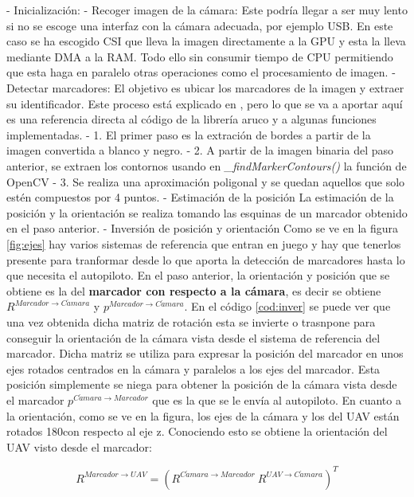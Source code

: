 - Inicialización: 
- Recoger imagen de la cámara: Este podría llegar a ser muy lento si no se escoge una interfaz con la cámara adecuada, por ejemplo USB. En este caso se ha escogido CSI que lleva la imagen directamente a la GPU y esta la lleva mediante DMA a la RAM. Todo ello sin consumir tiempo de CPU permitiendo que esta haga en paralelo otras operaciones como el procesamiento de imagen.
- Detectar marcadores: El objetivo es ubicar los marcadores de la imagen y extraer su identificador. Este proceso está explicado en \cite{aruco2014}, pero lo que se va a aportar aquí es una referencia directa al código de la librería aruco y a algunas funciones implementadas. 
	- 1. El primer paso es la extración de bordes a partir de la imagen convertida a blanco y negro. 
	- 2. A partir de la imagen binaria del paso anterior, se extraen los contornos usando en \textit{\_findMarkerContours()} la función de OpenCV  \textit{}
	- 3. Se realiza una aproximación poligonal y se quedan aquellos que solo estén compuestos por 4 puntos. 
- Estimación de la posición
	La estimación de la posición y la orientación se realiza tomando las esquinas de un marcador obtenido en el paso anterior.  
- Inversión de posición y orientación 
	Como se ve en la figura \ref{fig:ejes} hay varios sistemas de referencia que entran en juego y hay que tenerlos presente para tranformar desde lo que aporta la detección de marcadores hasta lo que necesita el autopiloto. En el paso anterior, la orientación y posición que se obtiene es la del \textbf{marcador con respecto a la cámara}, es decir se obtiene $R^{Marcador\rightarrow C\acute{a}mara}$ y $p^{Marcador\rightarrow C\acute{a}mara}$. En el código \ref{cod:inver} se puede ver que una vez obtenida dicha matriz de rotación esta se invierte o trasnpone para conseguir la orientación de la cámara vista desde el sistema de referencia del marcador. Dicha matriz se utiliza para expresar la posición del marcador en unos ejes rotados centrados en la cámara y paralelos a los ejes del marcador. Esta posición simplemente se niega para obtener la posición de la cámara vista desde el marcador $p^{C\acute{a}mara\rightarrow Marcador}$ que es la que se le envía al autopiloto. En cuanto a la orientación, como se ve en la figura, los ejes de la cámara y los del UAV están rotados 180\textdegree con respecto al eje z. Conociendo esto se obtiene la orientación del UAV visto desde el marcador:

	\begin{equation}
	R^{Marcador\rightarrow UAV}=\left( R^{C\acute{a}mara\rightarrow Marcador}\ R^{UAV\rightarrow C\acute{a}mara} \right)^T
	\end{equation}

